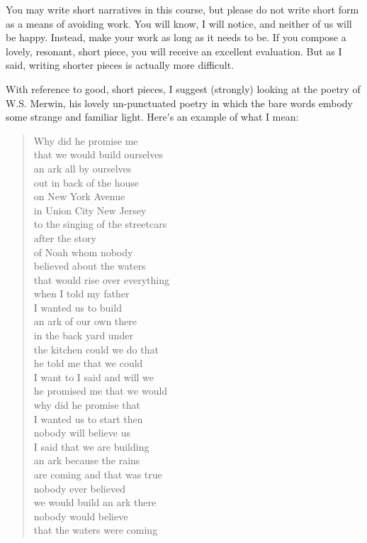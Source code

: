 \documentclass[letterpaper,10pt,headsepline]{scrreprt}
\begin{document}
You may write short narratives in this course, but please do not write
short form as a means of avoiding work. You will know, I will notice,
and neither of us will be happy. Instead, make your work as long as it
needs to be. If you compose a lovely, resonant, short piece, you will
receive an excellent evaluation. But as I said, writing shorter pieces
is actually more difficult.

With reference to good, short pieces, I suggest (strongly) looking at
the poetry of W.S. Merwin, his lovely un-punctuated poetry in which
the bare words embody some strange and familiar light. Here's an
example of what I mean:
\clearpage
\begin{verse}
Why did he promise me\\
that we would build ourselves\\
an ark all by ourselves\\
out in back of the house\\
on New York Avenue\\
in Union City New Jersey\\
to the singing of the streetcars\\
after the story\\
of Noah whom nobody\\
believed about the waters\\
that would rise over everything\\
when I told my father\\
I wanted us to build\\
an ark of our own there\\
in the back yard under\\
the kitchen could we do that\\
he told me that we could\\
I want to I said and will we\\
he promised me that we would\\
why did he promise that\\
I wanted us to start then\\
nobody will believe us\\
I said that we are building\\
an ark because the rains\\
are coming and that was true\\
nobody ever believed\\
we would build an ark there\\
nobody would believe\\
that the waters were coming\\
\end{verse}
\end{document}
